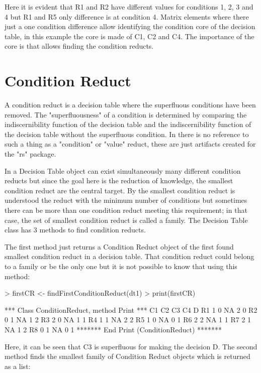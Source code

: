 \documentclass[a4paper]{article}
\begin{document}
Here it is evident that R1 and R2 have different values for conditions 1, 2, 3 and 4 but R1 and R5 only difference is at condition 4. Matrix elements where there just a one condition difference allow identifying the condition core of the decision table, in this example the core is made of C1, C2 and C4. The importance of the core is that allows finding the condition reducts.

\section{Condition Reduct}
A condition reduct is a decision table where the superfluous conditions have been removed. The "superfluousness" of a condition is determined by comparing the indiscernibility function of the decision table and the indiscernibility function of the decision table without the superfluous condition. In \cite{pawlak} there is no reference to such a thing as a "condition" or "value" reduct, these are just artifacts created for the "rs" package.

In a Decision Table object can exist simultaneously many different condition reducts but since the goal here is the reduction of knowledge, the smallest condition reduct are the central target. By the smallest condition reduct is understood the reduct with the minimum number of conditions but sometimes there can be more than one condition reduct meeting this requirement; in that case, the set of smallest condition reduct is called a family. The Decision Table class has 3 methods to find condition reducts.

The first method just returns a Condition Reduct object of the first found smallest condition reduct in a decision table. That condition reduct could belong to a family or be the only one but it is not possible to know that using this method:

\begin{Schunk}
\begin{Sinput}
> firstCR <- findFirstConditionReduct(dt1)
> print(firstCR)
\end{Sinput}
\begin{Soutput}
*** Class ConditionReduct, method Print *** 
   C1 C2 C3 C4 D
R1 1  0  NA 2  0
R2 0  1  NA 1  2
R3 2  0  NA 1  1
R4 1  1  NA 2  2
R5 1  0  NA 0  1
R6 2  2  NA 1  1
R7 2  1  NA 1  2
R8 0  1  NA 0  1
******* End Print (ConditionReduct) ******* 
\end{Soutput}
\end{Schunk}

Here, it can be seen that C3 is superfluous for making the decision D. The second method finds the smallest family of Condition Reduct objects which is returned as a list:
\end{document}

